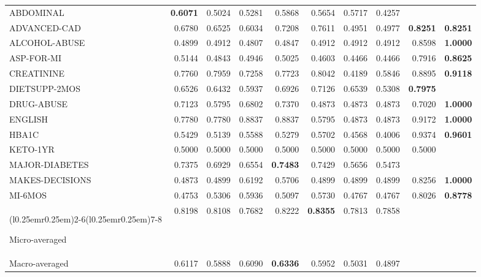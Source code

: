 \begin{table}[!t]
\begin{tabular}{lrrrrrrrrr}
\textsf{ABDOMINAL}       & \textbf{0.6071} & 0.5024 & 0.5281 & 0.5868          & 0.5654 & 0.5717 & 0.4257 &                 &\\
\textsf{ADVANCED-CAD}    & 0.6780          & 0.6525 & 0.6034 & 0.7208          & 0.7611 & 0.4951 & 0.4977 & \textbf{0.8251} & \textbf{0.8251}\\
\textsf{ALCOHOL-ABUSE}   & 0.4899          & 0.4912 & 0.4807 & 0.4847          & 0.4912 & 0.4912 & 0.4912 &          0.8598 & \textbf{1.0000}\\
\textsf{ASP-FOR-MI}      & 0.5144          & 0.4843 & 0.4946 & 0.5025          & 0.4603 & 0.4466 & 0.4466 &          0.7916 & \textbf{0.8625}\\
\textsf{CREATININE}      & 0.7760          & 0.7959 & 0.7258 & 0.7723          & 0.8042 & 0.4189 & 0.5846 &          0.8895 & \textbf{0.9118}\\
\textsf{DIETSUPP-2MOS}   & 0.6526          & 0.6432 & 0.5937 & 0.6926          & 0.7126 & 0.6539 & 0.5308 & \textbf{0.7975} &\\
\textsf{DRUG-ABUSE}      & 0.7123          & 0.5795 & 0.6802 & 0.7370          & 0.4873 & 0.4873 & 0.4873 & 0.7020          & \textbf{1.0000}\\
\textsf{ENGLISH}         & 0.7780          & 0.7780 & 0.8837 & 0.8837          & 0.5795 & 0.4873 & 0.4873 & 0.9172          & \textbf{1.0000}\\
\textsf{HBA1C}           & 0.5429          & 0.5139 & 0.5588 & 0.5279          & 0.5702 & 0.4568 & 0.4006 & 0.9374          & \textbf{0.9601}\\
\textsf{KETO-1YR}        & 0.5000          & 0.5000 & 0.5000 & 0.5000          & 0.5000 & 0.5000 & 0.5000 & 0.5000          &\\
\textsf{MAJOR-DIABETES}  & 0.7375          & 0.6929 & 0.6554 & \textbf{0.7483} & 0.7429 & 0.5656 & 0.5473 &                 &\\
\textsf{MAKES-DECISIONS} & 0.4873          & 0.4899 & 0.6192 & 0.5706          & 0.4899 & 0.4899 & 0.4899 & 0.8256          & \textbf{1.0000}\\
\textsf{MI-6MOS}         & 0.4753          & 0.5306 & 0.5936 & 0.5097          & 0.5730 & 0.4767 & 0.4767 & 0.8026          & \textbf{0.8778}\\

\cmidrule(r{0.25em}){1-1}\cmidrule(l{0.25em}r{0.25em}){2-6}\cmidrule(l{0.25em}r{0.25em}){7-8}\cmidrule(l{0.25em}){9-10}

Micro-averaged & 0.8198 & 0.8108 & 0.7682 & 0.8222          & \textbf{0.8355} & 0.7813 & 0.7858 & &\\
Macro-averaged & 0.6117 & 0.5888 & 0.6090 & \textbf{0.6336} & 0.5952          & 0.5031 & 0.4897 & &\\


\end{tabular}
\end{table}
